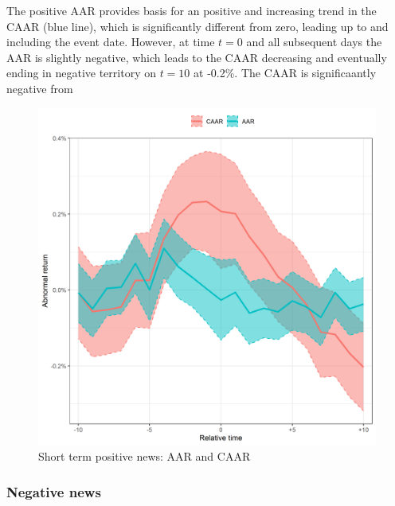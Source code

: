 The positive AAR provides basis for an positive and increasing trend in the CAAR (blue line), which is significantly different from zero, leading up to and including the event date. 
However, at time $t = 0$ and all subsequent days the AAR is slightly negative, which leads to the CAAR decreasing and eventually ending in negative territory on $t = 10$ at -0.2\%. The CAAR is significaantly negative from  



\begin{figure} [H] 
    \centering
    \includegraphics[scale=0.6]{Projekt/1.Figures analysis/ST_positive_all_CI.png}
    \caption{Short term positive news: AAR and CAAR}
    \label{fig:ST_pos_news}
\end{figure}


 \label{ST_tab}

\subsubsection{Negative news}


